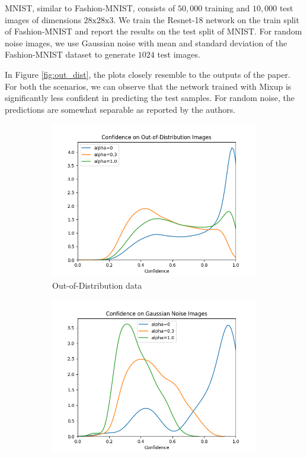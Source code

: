 \documentclass{article}
\begin{document}
MNIST, similar to Fashion-MNIST, consists of $50,000$ training and $10,000$ test images of dimensions $28\text{x}28\text{x}3$. We train the Resnet-18 network on the train split of Fashion-MNIST and report the results on the test split of MNIST. For random noise images, we use Gaussian noise with mean and standard deviation of the Fashion-MNIST dataset to generate $1024$ test images. 

In Figure \ref{fig:out_dist}, the plots closely resemble to the outputs of the paper. For both the scenarios, we can observe that the network trained with Mixup is significantly less confident in predicting the test samples. For random noise, the predictions are somewhat separable as reported by the authors. 
\begin{figure}[h]
     \centering
     \begin{subfigure}[b]{0.45\textwidth}
         \centering
         \includegraphics[width=\textwidth]{images/ood/distplot.png}
         \caption{Out-of-Distribution data}
     \end{subfigure}
     \begin{subfigure}[b]{0.45\textwidth}
         \centering
         \includegraphics[width=\textwidth]{images/noise/distplot.png}

\end{subfigure}
\end{figure}
\end{document}
